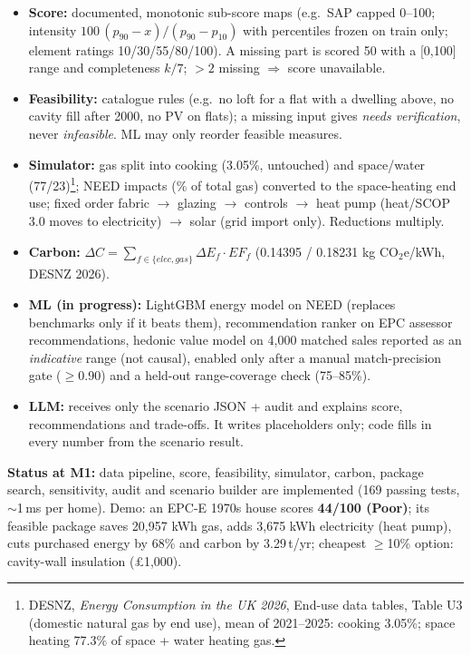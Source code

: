 \documentclass[10pt,a4paper]{article}
\begin{document}
\vspace{-4pt}
\begin{itemize}
\item \textbf{Score:} documented, monotonic sub-score maps (e.g.\ SAP capped 0--100; intensity
$100\,(p_{90}-x)/(p_{90}-p_{10})$ with percentiles frozen on train only; element ratings 10/30/55/80/100). A missing part
is scored 50 with a [0,100] range and completeness $k/7$; $>2$ missing $\Rightarrow$ score unavailable.
\item \textbf{Feasibility:} catalogue rules (e.g.\ no loft for a flat with a dwelling above, no cavity fill after 2000,
no PV on flats); a missing input gives \emph{needs verification}, never \emph{infeasible}. ML may only reorder feasible measures.
\item \textbf{Simulator:} gas split into cooking (3.05\%, untouched) and space/water (77/23)\footnote{DESNZ, \emph{Energy Consumption in the UK 2026}, End-use data tables, Table U3 (domestic
natural gas by end use), mean of 2021--2025: cooking 3.05\%; space heating 77.3\% of space + water heating gas.}; NEED impacts
(\% of total gas) converted to the space-heating end use; fixed order fabric $\rightarrow$ glazing $\rightarrow$ controls
$\rightarrow$ heat pump (heat/SCOP 3.0 moves to electricity) $\rightarrow$ solar (grid import only). Reductions multiply.
\item \textbf{Carbon:} $\Delta C=\sum_{f\in\{elec,gas\}}\Delta E_f\cdot EF_f$ (0.14395 / 0.18231 kg CO$_2$e/kWh, DESNZ 2026).
\item \textbf{ML (in progress):} LightGBM energy model on NEED (replaces benchmarks only if it beats them), recommendation
ranker on EPC assessor recommendations, hedonic value model on 4,000 matched sales reported as an \emph{indicative} range (not causal),
enabled only after a manual match-precision gate ($\ge$0.90) and a held-out range-coverage check (75--85\%).
\item \textbf{LLM:} receives only the scenario JSON + audit and explains score, recommendations and trade-offs. It writes
placeholders only; code fills in every number from the scenario result.
\end{itemize}

\textbf{Status at M1:} data pipeline, score, feasibility, simulator, carbon, package search, sensitivity, audit and
scenario builder are implemented (169 passing tests, $\sim$1\,ms per home). Demo: an EPC-E 1970s house scores
\textbf{44/100 (Poor)}; its feasible package saves 20,957 kWh gas, adds 3,675 kWh electricity (heat pump), cuts
purchased energy by 68\% and carbon by 3.29\,t/yr; cheapest $\ge$10\% option: cavity-wall insulation (\pounds1,000).
\end{document}
